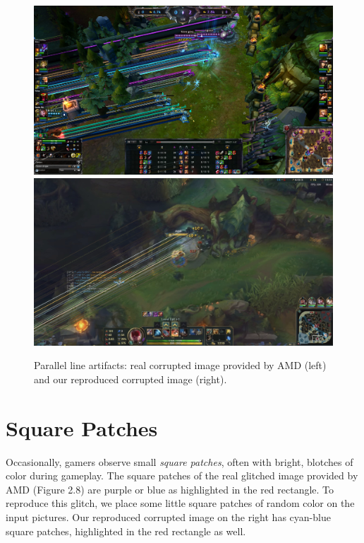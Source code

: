 \begin{figure}[!ht]
\includegraphics[scale=.2025]{images/pl1.jpg}
\includegraphics[scale=.135]{images/pl2.png}
\vspace{5pt}
\caption[Parallel line artifacts]{Parallel line artifacts: real corrupted image provided by AMD (left) and our reproduced corrupted image (right).}
\label{fig:pl}
\end{figure}


\section*{Square Patches}
Occasionally, gamers observe small \textit{square patches}, often with bright, blotches of color during gameplay. The square patches of the real glitched image provided by AMD (Figure 2.8) are purple or blue as highlighted in the red rectangle. To reproduce this glitch, we place some little square patches of random color on the input pictures. Our reproduced corrupted image on the right has cyan-blue square patches, highlighted in the red rectangle as well.
\newpage

